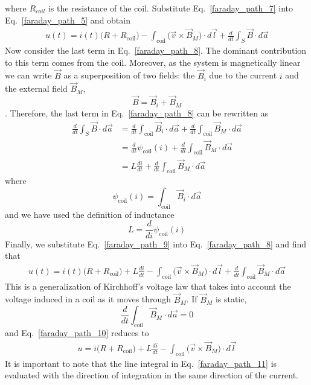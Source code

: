 \documentclass[11pt,a4paper,oneside]{book}
\numberwithin{equation}{section}
\theoremstyle{it}
\theoremstyle{definition}
\begin{document}
where $R_{coil}$ is the resistance of the coil. Substitute Eq.~\eqref{faraday_path_7} into Eq.~\eqref{faraday_path_5} and obtain
 \begin{equation}\label{faraday_path_8}
	\begin{aligned}
		u(t) = i(t)\big(R+R_{\text{coil}}\big)-\int_{\text{coil}}\big(\vec{v}\times\vec{B}_M\big)\cdot d\vec{l} + \frac{d}{dt}\int_S\vec{B}\cdot d\vec{a}
	\end{aligned}
\end{equation} 
Now consider the last term in Eq.~\eqref{faraday_path_8}. The dominant contribution to this term comes from the coil. Moreover, as the system is magnetically linear we can write $\vec{B}$ as a superposition of two fields: the $\vec{B}_i$ due to the current $i$ and the external field $\vec{B}_M$, $$ \vec{B}=\vec{B}_i+\vec{B}_M$$. Therefore, the last term in Eq.~\eqref{faraday_path_8} can be rewritten as
 \begin{equation}\label{faraday_path_9}
	\begin{aligned}
		\frac{d}{dt}\int_S\vec{B}\cdot d\vec{a} &= \frac{d}{dt}\int_{\text{coil}}\vec{B}_i\cdot d\vec{a} + \frac{d}{dt}\int_{\text{coil}}\vec{B}_M\cdot d\vec{a}  \\[8pt]
		&= \frac{d}{dt} \psi_{\text{coil}}(i) + \frac{d}{dt}\int_{\text{coil}}\vec{B}_M\cdot d\vec{a} \\[8pt]
		&= L\frac{di}{dt} + \frac{d}{dt}\int_{\text{coil}}\vec{B}_M\cdot d\vec{a}
	\end{aligned}
\end{equation} 
where $$\psi_{\text{coil}}(i)=\int_{\text{coil}}\vec{B}_i\cdot d\vec{a}$$ and we have used the definition of inductance $$L=\frac{d}{di} \psi_{\text{coil}}(i)$$
Finally, we substitute Eq.~\eqref{faraday_path_9} into Eq.~\eqref{faraday_path_8} and find that
 \begin{equation}\label{faraday_path_10}
	\begin{aligned}
		u(t) = i(t)\big(R+R_{\text{coil}}\big)+L\frac{di}{dt}-\int_{\text{coil}}\big(\vec{v}\times\vec{B}_M\big)\cdot d\vec{l} + \frac{d}{dt}\int_{\text{coil}}\vec{B}_M\cdot d\vec{a}
	\end{aligned}
\end{equation} 
This is a generalization of Kirchhoff's voltage law that takes into account the voltage induced in a coil as it moves through $\vec{B}_M$. If $\vec{B}_M$ is static, $$\frac{d}{dt}\int_{\text{coil}}\vec{B}_M\cdot d\vec{a}=0$$ and Eq.~\eqref{faraday_path_10} reduces to 
  \begin{equation}\label{faraday_path_11}
 	\begin{aligned}
 		u = i\big(R+R_{\text{coil}}\big)+L\frac{di}{dt}-\int_{\text{coil}}\big(\vec{v}\times\vec{B}_M\big)\cdot d\vec{l}
 	\end{aligned}
 \end{equation} 
It is important to note that the line integral in Eq.~\eqref{faraday_path_11} is evaluated with the direction of integration in the same direction of the current.
\end{document}
